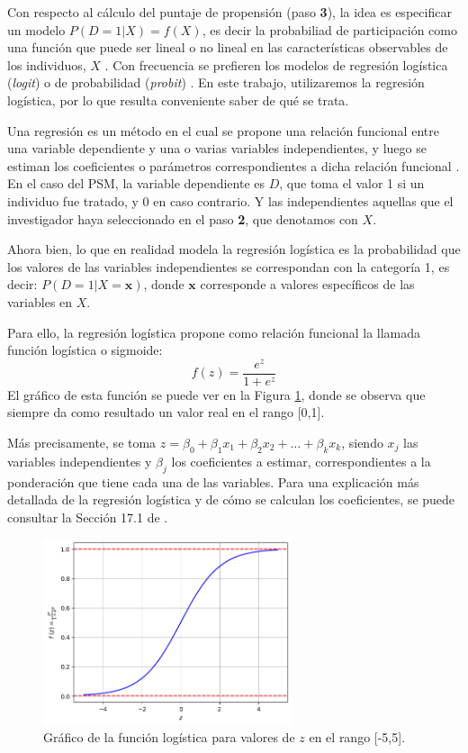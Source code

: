 \documentclass[../../main.tex]{subfiles}
\begin{document}
Con respecto al cálculo del puntaje de propensión (paso \textbf{3}), la idea es
especificar un modelo \(P(D=1|X) = f(X)\), es decir la probabiliad de participación como
una función que puede ser lineal o no lineal en las características observables de los
individuos, \(X\) \cite{bernal}. Con frecuencia se prefieren los modelos de regresión
logística (\textit{logit}) o de probabilidad (\textit{probit}) \cite{bernal}. En este
trabajo, utilizaremos la regresión logística, por lo que resulta conveniente saber de qué
se trata.

Una regresión es un método en el cual se propone una relación funcional entre una variable
dependiente y una o varias variables independientes, y luego se estiman los coeficientes o
parámetros correspondientes a dicha relación funcional \cite{giuliodori-2022}. En el caso
del PSM, la variable dependiente es \(D\), que toma el valor 1 si un individuo fue
tratado, y 0 en caso contrario. Y las independientes aquellas que el investigador haya
seleccionado en el paso \textbf{2}, que denotamos con \(X\).

Ahora bien, lo que en realidad modela la regresión logística es la probabilidad que los
valores de las variables independientes se correspondan con la categoría 1, es decir:
\(P(D=1|X=\bm{x})\), donde \(\bm{x}\) corresponde a valores específicos de las variables
en \(X\).

Para ello, la regresión logística propone como relación funcional la llamada función
logística o sigmoide:
\[
    f(z) = \frac{e^z}{1 + e^z}
\]
El gráfico de esta función se puede ver en la Figura \ref{fig:logit}, donde se observa que
siempre da como resultado un valor real en el rango [0,1].

Más precisamente, se toma \(z = \beta_0 + \beta_1 x_1 + \beta_2 x_2 + \dots +
\beta_k x_k\), siendo \(x_j\) las variables independientes y \(\beta_j\) los coeficientes
a estimar, correspondientes a la ponderación que tiene cada una de las variables. Para
una explicación más detallada de la regresión logística y de cómo se calculan los coeficientes,
se puede consultar la Sección 17.1 de \cite{intro-econometria-wooldridge}.

\begin{figure}[h!]
    \centering
    \includegraphics[width=0.65\textwidth]{figs/logit.png}
    \caption{Gráfico de la función logística para valores de \(z\) en el rango [-5,5].}
    \label{fig:logit}
\end{figure}
\end{document}
